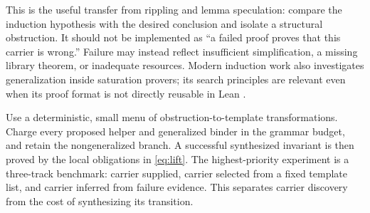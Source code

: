 This is the useful transfer from rippling and lemma speculation: compare the
induction hypothesis with the desired conclusion and isolate a structural
obstruction. It should not be implemented as ``a failed proof proves that this
carrier is wrong.'' Failure may instead reflect insufficient simplification,
a missing library theorem, or inadequate resources. Modern induction work
also investigates generalization inside saturation provers; its search
principles are relevant even when its proof format is not directly reusable
in Lean \cite{inductiongeneralization}.

Use a deterministic, small menu of obstruction-to-template transformations.
Charge every proposed helper and generalized binder in the grammar budget,
and retain the nongeneralized branch. A successful synthesized invariant is
then proved by the local obligations in \eqref{eq:lift}. The highest-priority
experiment is a three-track benchmark: carrier supplied, carrier selected
from a fixed template list, and carrier inferred from failure evidence. This
separates carrier discovery from the cost of synthesizing its transition.
